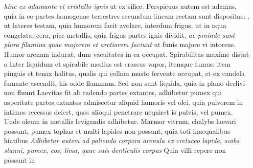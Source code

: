 \textit{hinc ex adamante et cristallo ignis } ut ex silice. Perspicuus autem est adamas, quia in eo partes homogenae terrestres secundum lineam rectam sunt dispositae. , ut lateres testam, quia humorem facit avolare, interdum frigus, ut in aqua congelata, cera, pice metallis, quia frigus partes ignis dividit, \textit{ac proinde sunt plura filamina quae majorem et arctiorem faciunt } ut funis majore vi intorsus. Humor arenam indurat, dum vacuitates in ea occupat. Spirabilitas\protect{} maxime distat a  Inter liquidum et spirabile medius est crassus vapor, itemque fumus: item pinguis et tenax halitus, qualis qui cellam\protect{} musto fervente occupat, et ex candela fumante ascendit, his adde flammam. Sed non sunt liquida, quia in plano declivi non fluunt  Laevitas fit ab radendo partes extantes, adhibetur pumex qui asperitate partes extantes  admiscetur aliquid humoris vel olei, quia pulverem in intimos recessus defert, quos alioqui penetrare nequiret is pulvis, vel pumex. Unde oleum in metallis levigandis adhibetur. Marmor\protect{} vitrum, chalybs\protect{} laevari possunt, pumex tophus et multi lapides non possunt, quia toti inaequalibus hiatibus  \textit{Adhibetur autem ad polienda corpora arenula\protect{} ex cretaceo lapide\protect{}, scobs stanni\protect{}, pumex\protect{}, cos\protect{}, lima\protect{}, quae suis denticulis corpus } Quia villi repere non possunt in 
